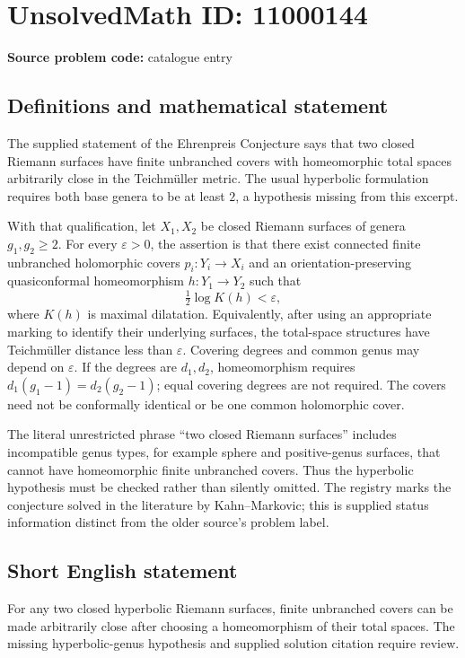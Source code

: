 \documentclass[11pt]{article}
\begin{document}
\section*{UnsolvedMath ID: 11000144}
\textbf{Source problem code:} catalogue entry
\subsection{Definitions and mathematical statement}
The supplied statement of the Ehrenpreis Conjecture says that two closed Riemann surfaces have finite unbranched covers with homeomorphic total spaces arbitrarily close in the Teichm\"uller metric. The usual hyperbolic formulation requires both base genera to be at least $2$, a hypothesis missing from this excerpt.

With that qualification, let $X_1,X_2$ be closed Riemann surfaces of genera $g_1,g_2\geq2$. For every $\varepsilon>0$, the assertion is that there exist connected finite unbranched holomorphic covers $p_i:Y_i\to X_i$ and an orientation-preserving quasiconformal homeomorphism $h:Y_1\to Y_2$ such that
\[
 \tfrac12\log K(h)<\varepsilon,
\]
where $K(h)$ is maximal dilatation. Equivalently, after using an appropriate marking to identify their underlying surfaces, the total-space structures have Teichm\"uller distance less than $\varepsilon$. Covering degrees and common genus may depend on $\varepsilon$. If the degrees are $d_1,d_2$, homeomorphism requires $d_1(g_1-1)=d_2(g_2-1)$; equal covering degrees are not required. The covers need not be conformally identical or be one common holomorphic cover.

The literal unrestricted phrase ``two closed Riemann surfaces'' includes incompatible genus types, for example sphere and positive-genus surfaces, that cannot have homeomorphic finite unbranched covers. Thus the hyperbolic hypothesis must be checked rather than silently omitted. The registry marks the conjecture solved in the literature by Kahn--Markovic; this is supplied status information distinct from the older source's problem label.
\subsection{Short English statement}
For any two closed hyperbolic Riemann surfaces, finite unbranched covers can be made arbitrarily close after choosing a homeomorphism of their total spaces. The missing hyperbolic-genus hypothesis and supplied solution citation require review.
\end{document}
